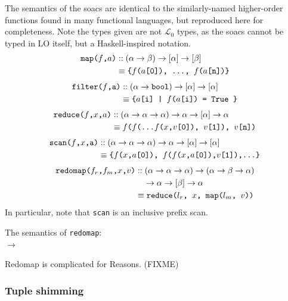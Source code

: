 \documentclass{sigplanconf}  %
\newcommand{\LO}{$\mathcal{L}_0$}
\begin{document}
The semantics of the {\sc soac}s are identical to the similarly-named
higher-order functions found in many functional languages, but
reproduced here for completeness.  Note the types given are not \LO{}
types, as the {\sc soac}s cannot be typed in LO{} itself, but a
Haskell-inspired notation.
\begin{align*}
\text{\tt map($f$,$a$)}
& :: (\alpha\rightarrow\beta)\rightarrow[\alpha]\rightarrow[\beta] \\
& \equiv \text{\tt\{$f$($a$[0]), \ldots, $f$($a$[n])\}}
\end{align*}
\begin{align*}
\text{\tt filter($f$,a)}
& :: (\alpha\rightarrow{\tt bool})\rightarrow[\alpha]\rightarrow[\alpha] \\
& \equiv \text{\tt\{$a$[i] | $f$($a$[i]) = {\tt True }\}}
\end{align*}
\begin{align*}
\text{\tt reduce($f$,$x$,$a$)}
& :: (\alpha\rightarrow\alpha\rightarrow\alpha)\rightarrow\alpha\rightarrow[\alpha]\rightarrow\alpha \\
& \equiv \text{\tt $f$($f$(\ldots $f$($x$,$v$[0]), $v$[1]), $v$[n])}
\end{align*}
\begin{align*}
\text{\tt scan($f$,$x$,a)}
& :: (\alpha\rightarrow\alpha\rightarrow\alpha)\rightarrow\alpha\rightarrow[\alpha]\rightarrow[\alpha] \\
& \equiv \text{\tt\{$f$($x$,$a$[0]), $f$($f$($x$,$a$[0]),$v$[1]),\ldots\}}
\end{align*}
\begin{align*}
\text{\tt redomap($f_{r}$,$f_{m}$,$x$,$v$)}
& :: (\alpha\rightarrow\alpha\rightarrow\alpha)\rightarrow(\alpha\rightarrow\beta\rightarrow\alpha)\\
& \quad\rightarrow\alpha\rightarrow[\beta]\rightarrow\alpha \\
& \equiv \text{\tt reduce($l_{r}$, $x$, map($l_{m}$, $v$))}
\end{align*}
In particular, note that {\tt scan} is an inclusive prefix scan.

The semantics of {\tt redomap}:\\
             $\rightarrow$

Redomap is complicated for Reasons. (FIXME)

\subsubsection{Tuple shimming}
\label{sec:shimming}
\end{document}
